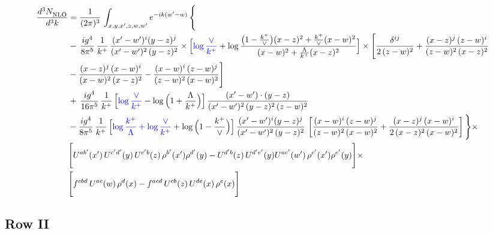 \documentclass[9pt]{article}
\numberwithin{equation}{section}
\begin{document}
\begin{align}
     \frac{d^{3}N_{\rm NLO}^{\rm}}{d^{3}k}  & =  \frac{1}{(2\pi)^{3}}\, \int_{x,y,x',z,w,w^{\prime}} e^{-ik(w^{\prime}-w)}\, \Bigg\{\notag \\ & -\,\frac{ig^{4}}{8\pi^{5}}\,\frac{1}{k^{+}}\,\frac{(x'-w')^{i}(y-z)^{j}}{(x'-w')^{2}\,(y-z)^{2}}\times \Big[{\color{blue}\log\frac{\vee}{k^{+}}}+\log\frac{\big(1-\frac{k^{+}}{\vee}\big)(x-z)^{2}+\frac{k^{+}}{\vee}(x-w)^{2}}{(x-w)^{2}+\frac{\Lambda}{k^{+}}(x-z)^{2}}\Big]\times \Bigg[\frac{\delta^{ij}}{2\,(z-w)^{2}}+\frac{(x-z)^{j}\,(z-w)^{i}}{(z-w)^{2}\,(x-z)^{2}}\notag \\ & -\frac{(x-z)^{j}\,(x-w)^{i}}{(x-w)^{2}\,(x-z)^{2}}-\frac{(x-w)^{i}\,(z-w)^{j}}{(z-w)^{2}\,(x-w)^{2}}\Bigg]\notag \\ & +\,\frac{ig^{4}}{16\pi^{5}}\,\frac{1}{k^{+}}\,\Big[{\color{blue}\log\frac{\vee}{k^{+}}}-\log\Big(1+\frac{\Lambda}{k^{+}}\Big)\Big]\, \frac{(x'-w')\cdot (y-z)}{(x'-w')^{2}\,(y-z)^{2}\,(z-w)^{2}}\notag \\ & -\frac{ig^{4}}{8\pi^{5}}\,\frac{1}{k^{+}}\,\Big[{\color{blue}\log\frac{k^{+}}{\Lambda}+\log\frac{\vee}{k^{+}}}+\log\Big(1-\frac{k^{+}}{\vee}\Big)\Big]\,\frac{(x'-w')^{i}(y-z)^{j}}{(x'-w')^{2}\,(y-z)^{2}}\,\left[\frac{(x-w)^{i}\,(z-w)^{j}}{(z-w)^{2}\,(x-w)^{2}}+\frac{(x-z)^{j}\,(x-w)^{i}}{2\,(x-z)^{2}\, (x-w)^{2}}\right]\Bigg\}\times \notag \\ &  \Bigg[U^{ab'}(x')\,U^{c'd'}(y)\,U^{c'b}(z)\,\rho^{b'}(x')\rho^{d'}(y)-U^{d'b}(z)\,U^{d'e'}(y)U^{ac'}(w')\,\rho^{c'}(x')\rho^{e'}(y)\Bigg]\times\notag \\ & \Bigg[f^{cbd}\,U^{ac}(w)\,\rho^{d}(x)-f^{acd}\, U^{cb}(z)\,U^{de}(x)\,\rho^{e}(x)\Bigg] 
\end{align}

\subsection{Row II}
\end{document}
